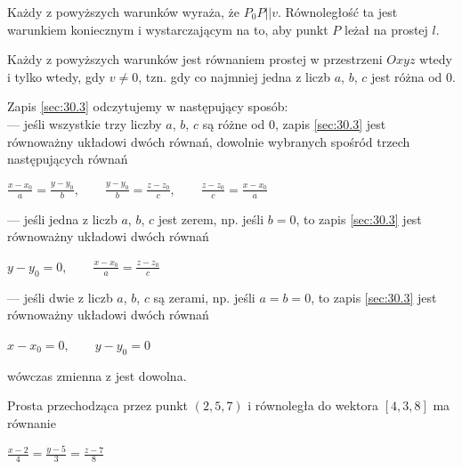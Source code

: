 \begin{dowod}
Każdy z powyższych warunków wyraża, że $P_0P||v$. Równoległość ta jest warunkiem koniecznym i wystarczającym na to, aby punkt $P$ leżał na prostej $l$.
\end{dowod}
\begin{uwaga}{1}
	Każdy z powyższych warunków jest równaniem prostej w przestrzeni $Oxyz$ wtedy i tylko wtedy, gdy $v \neq 0$, tzn. gdy co najmniej jedna z liczb $a$, $b$, $c$ jest różna od $0$.
\end{uwaga}
\begin{uwaga}{2}
	Zapis \ref{sec:30.3} odczytujemy w następujący sposób:\\
—	jeśli wszystkie trzy liczby $a$, $b$, $c$ są różne od $0$, zapis \ref{sec:30.3} jest równoważny układowi dwóch równań, dowolnie wybranych spośród trzech następujących równań

\begin{center}
$\frac{x - x_0}{a} = \frac{y - y_0}{b}, \qquad \frac{y - y_0}{b} = \frac{z - z_0}{c}, \qquad \frac{z - z_0}{c} = \frac{x - x_0}{a}$\\
\end{center}

—	jeśli jedna z liczb $a$, $b$, $c$ jest zerem, np. jeśli $b = 0$, to zapis \ref{sec:30.3} jest równoważny układowi dwóch równań
\begin{center}
$y - y_0 = 0, \qquad \frac{x - x_0}{a} = \frac{z - z_0}{c}$\\
\end{center}

—	jeśli dwie z liczb $a$, $b$, $c$ są zerami, np. jeśli $a = b = 0$, to zapis \ref{sec:30.3} jest równoważny układowi dwóch równań
\begin{center}
$x - x_0 = 0, \qquad y - y_0 = 0$\\
\end{center}

wówczas zmienna z jest dowolna.
\end{uwaga}

\begin{przyklad}{30.1}
Prosta przechodząca przez punkt $(2,5,7)$	i równoległa do wektora $[4,3,8]$ ma równanie
\begin{center}
$\frac{x - 2}{4} = \frac{y - 5}{3} = \frac{z - 7}{8}$\\
\end{center}
\end{przyklad}

